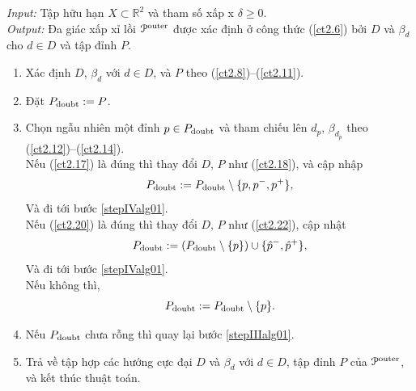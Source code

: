 \documentclass[12pt,a4paper,openany,oneside]{report}
\def\R{\mathbb{R}}
\begin{document}
\begin{algorithm}\label{alg01}  \rm 
		\caption{}  \label{al-blduoi0}
	\emph{Input:} Tập hữu hạn $X \subset \R^2$ và tham số xấp x $\delta \geq 0$. \\
	\emph{Output:} Đa giác xấp xỉ lồi ${\cal P}^{\rm outer}$ được xác định ở công thức (\ref{ct2.6}) bởi $D$ và $\beta_d$ cho $d \in D$ và tập đỉnh $P$.
	\begin{enumerate}
		\item\label{stepIalg01} 
		Xác định $D$, $\beta_d$ với $d \in D$, và $P$ theo (\ref{ct2.8})--(\ref{ct2.11}).
		
		\item\label{stepIIalg01} Đặt $P_{\rm doubt} := P$.
		
		\item\label{stepIIIalg01} 
		 Chọn ngẫu nhiên một đỉnh $p \in P_{\rm doubt}$  và tham chiếu lên $d_p$, $\beta_{d_p}$ theo (\ref{ct2.12})--(\ref{ct2.14}). \\
		Nếu (\ref{ct2.17}) là đúng thì thay đổi $D$, $P$ như (\ref{ct2.18}), và cập nhập
		\begin{equation}\label{ct2.23}
			P_{\rm doubt} := P_{\rm doubt} \setminus \{p, p^-, p^+\},
		\end{equation}
		Và đi tới bước \ref{stepIValg01}.\\
		Nếu %
		(\ref{ct2.20}) là đúng thì thay đổi $D$, $P$ như (\ref{ct2.22}), cập nhật
		\begin{equation}\label{ct2.24}
			P_{\rm doubt} := (P_{\rm doubt} \setminus \{p\}) \cup \{\hat p^-, \hat p^+\},
		\end{equation}
		Và đi tới bước \ref{stepIValg01}.\\
		Nếu không thì, 
		\begin{equation}\label{ct2.25}
			P_{\rm doubt} := P_{\rm doubt} \setminus \{p\}.
		\end{equation}
		
		\item\label{stepIValg01} 
		Nếu $P_{\rm doubt}$ chưa rỗng thì quay lại bước \ref{stepIIIalg01}.
		
		\item
		 Trả về tập hợp các hướng cực đại $D$ và $\beta_d$ với $d \in D$, tập đỉnh $P$ của ${\cal P}^{\rm outer}$, và kết thúc thuật toán.
	\end{enumerate}
\end{algorithm}
\end{document}
